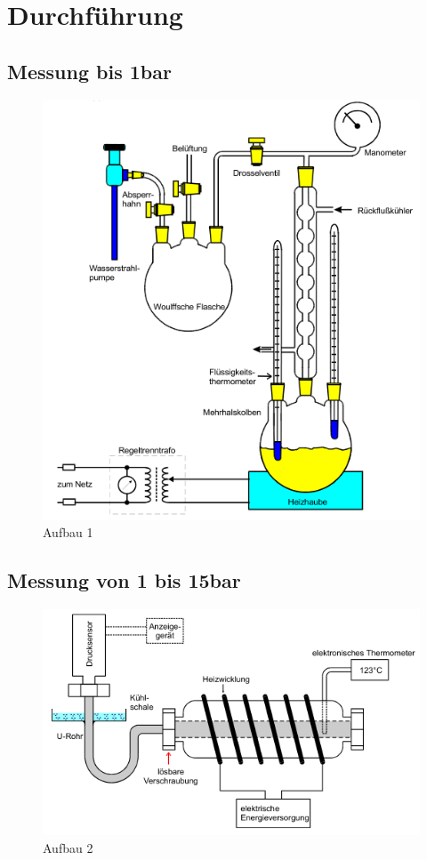 \section{Durchführung}
\label{sec:Durchführung}

\subsection{Messung bis 1bar}
\begin{figure}
    \centering
    \includegraphics{Aufbau1.png}
    \caption{Aufbau 1 \cite{sample}}
    \label{fig:aufbau1}
\end{figure}

\subsection{Messung von 1 bis 15bar}
\begin{figure}
  \centering
  \includegraphics{Aufbau2.png}
  \caption{Aufbau 2 \cite{sample}}
  \label{fig:aufbau2}
\end{figure}